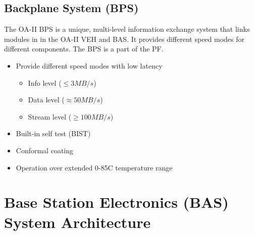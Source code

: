 \documentclass[12pt,article]{memoir}
\begin{document}
\section{Backplane System (BPS)}
The OA-II BPS is a unique, multi-level information exchange system that links modules in in the OA-II VEH and BAS. It provides different speed modes for different components. The BPS is a part of the PF.

\begin{itemize}
	\item Provide different speed modes with low latency
	\begin{itemize}
		\item Info level ($\leq 3MB/s$)
		\item Data level ($\approx 50MB/s$)
		\item Stream level ($\geq 100MB/s$)
	\end{itemize}
	\item Built-in self test (BIST)
	\item Conformal coating
	\item Operation over extended 0-85\degree C temperature range
\end{itemize}


\newpage

\chapter{Base Station Electronics (BAS) System Architecture}
\end{document}
